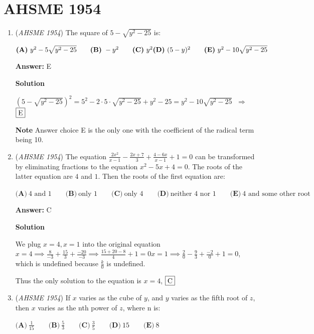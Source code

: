 \section{AHSME 1954}
        \begin{enumerate}
        	\item (\textit{AHSME 1954}) The square of $5-\sqrt{y^2-25}$ is: 


 $\textbf{(A)}\ y^2-5\sqrt{y^2-25} \qquad \textbf{(B)}\ -y^2 \qquad \textbf{(C)}\ y^2 \\ \textbf{(D)}\ (5-y)^2\qquad\textbf{(E)}\ y^2-10\sqrt{y^2-25}$

 \textbf{Answer: }E



\textbf{Solution}

$(5-\sqrt{y^2-25})^2 = 5^2-2\cdot 5\cdot\sqrt{y^2-25}+y^2-25 = y^2-10\sqrt{y^2-25}$ $\ \Rightarrow$ $\fbox{E}$

 \textbf{Note} Answer choice E is the only one with the coefficient of the radical term being 10.

 


	\item (\textit{AHSME 1954}) The equation $\frac{2x^2}{x-1}-\frac{2x+7}{3}+\frac{4-6x}{x-1}+1=0$ can be transformed by eliminating fractions to the equation $x^2-5x+4=0$. 
The roots of the latter equation are $4$ and $1$. Then the roots of the first equation are: 


 $\textbf{(A)}\ 4 \text{ and }1 \qquad \textbf{(B)}\ \text{only }1 \qquad \textbf{(C)}\ \text{only }4 \qquad \textbf{(D)}\ \text{neither 4 nor 1}\qquad\textbf{(E)}\ \text{4 and some other root}$

 \textbf{Answer: }C



\textbf{Solution}

We plug $x=4, x=1$ into the original equation$x=4\implies\frac{8}{-3}+\frac{15}{3}+\frac{-20}{-3}\implies\frac{15+20-8}{4}+1=0$$x=1\implies\frac{2}{0}-\frac{9}{3}+\frac{-2}{0}+1=0$, which is undefined because $\frac{k}{0}$ is undefined. 

 Thus the only solution to the equation is $x=4$, $\fbox{C}$



	\item (\textit{AHSME 1954}) If $x$ varies as the cube of $y$, and $y$ varies as the fifth root of $z$, then $x$ varies as the nth power of $z$, where n is:


 $\textbf{(A)}\ \frac{1}{15} \qquad\textbf{(B)}\ \frac{5}{3} \qquad\textbf{(C)}\ \frac{3}{5} \qquad\textbf{(D)}\ 15\qquad\textbf{(E)}\ 8$


\end{enumerate}

